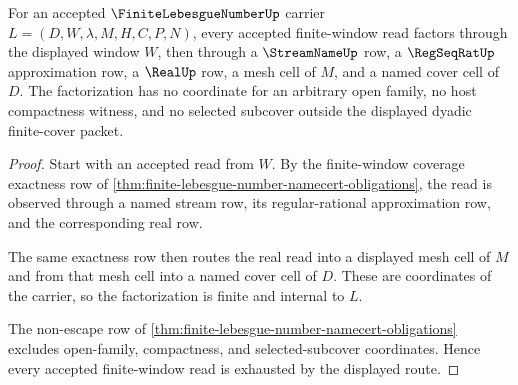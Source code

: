 \begin{theorem}
\label{thm:finite-lebesgue-number-window-coverage-exactness}
For an accepted $\FiniteLebesgueNumberUp$ carrier $L=(D,W,\lambda,M,H,C,P,N)$, every accepted finite-window read factors through the displayed window $W$, then through a $\StreamNameUp$ row, a $\RegSeqRatUp$ approximation row, a $\RealUp$ row, a mesh cell of $M$, and a named cover cell of $D$. The factorization has no coordinate for an arbitrary open family, no host compactness witness, and no selected subcover outside the displayed dyadic finite-cover packet.
\end{theorem}
\begin{proof}
Start with an accepted read from $W$. By the finite-window coverage exactness row of \autoref{thm:finite-lebesgue-number-namecert-obligations}, the read is observed through a named stream row, its regular-rational approximation row, and the corresponding real row.

The same exactness row then routes the real read into a displayed mesh cell of $M$ and from that mesh cell into a named cover cell of $D$. These are coordinates of the carrier, so the factorization is finite and internal to $L$.

The non-escape row of \autoref{thm:finite-lebesgue-number-namecert-obligations} excludes open-family, compactness, and selected-subcover coordinates. Hence every accepted finite-window read is exhausted by the displayed route.
\end{proof}

